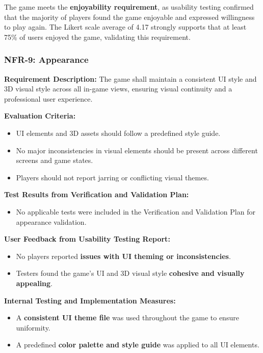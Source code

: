 \documentclass[12pt, titlepage]{article}
\begin{document}
The game meets the \textbf{enjoyability requirement}, as usability testing confirmed that the majority of players found the game enjoyable and expressed willingness to play again. The Likert scale average of 4.17 strongly supports that at least 75\% of users enjoyed the game, validating this requirement.


\subsubsection{NFR-9: Appearance}
\label{NFR9}

\textbf{Requirement Description:}  
The game shall maintain a consistent UI style and 3D visual style across all in-game views, ensuring visual continuity and a professional user experience.

\textbf{Evaluation Criteria:}  
\begin{itemize}
    \item UI elements and 3D assets should follow a predefined style guide.
    \item No major inconsistencies in visual elements should be present across different screens and game states.
    \item Players should not report jarring or conflicting visual themes.
\end{itemize}

\textbf{Test Results from Verification and Validation Plan:}  
\begin{itemize}
    \item No applicable tests were included in the Verification and Validation Plan for appearance validation.
\end{itemize}

\textbf{User Feedback from Usability Testing Report:}  
\begin{itemize}
    \item No players reported \textbf{issues with UI theming or inconsistencies}.
    \item Testers found the game’s UI and 3D visual style \textbf{cohesive and visually appealing}.
\end{itemize}

\textbf{Internal Testing and Implementation Measures:}  
\begin{itemize}
    \item A \textbf{consistent UI theme file} was used throughout the game to ensure uniformity.
    \item A predefined \textbf{color palette and style guide} was applied to all UI elements.
\end{itemize}
\end{document}
